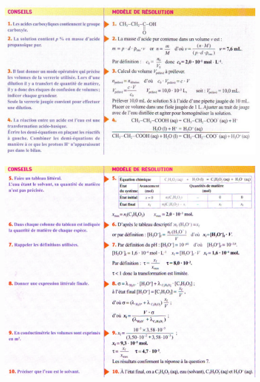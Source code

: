 \documentclass[11pt,a4paper]{article}
\begin{document}
\begin{figure}[h]
    \centering
    \includegraphics[width=0.9\linewidth]{imgs/c2/cxo1.jpg}
\end{figure}
\begin{figure}[h]
    \centering
    \includegraphics[width=0.9\linewidth]{imgs/c2/cxo1a.jpg}
\end{figure}
\end{document}
